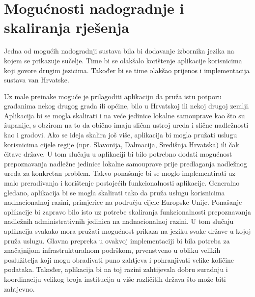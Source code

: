 		\eject
		
		\section{Mogućnosti nadogradnje i skaliranja rješenja} 
		
		Jedna od mogućih nadogradnji sustava bila bi dodavanje izbornika jezika na kojem se prikazuje sučelje. Time bi se olakšalo korištenje aplikacije korisnicima koji govore drugim jezicima. Također bi se time olakšao prijenos i implementacija sustava van Hrvatske.
		
		Uz male preinake moguće je prilagoditi aplikaciju da pruža istu potporu građanima nekog drugog grada ili općine, bilo u Hrvatskoj ili nekoj drugoj zemlji. Aplikacija bi se mogla skalirati i na veće jedinice lokalne samouprave kao što su županije, s obzirom na to da obično imaju sličan ustroj ureda i slične nadležnosti kao i gradovi. Ako se ideja skalira još više, aplikacija bi mogla pružati uslugu korisnicima cijele regije (npr. Slavonija, Dalmacija, Središnja Hrvatska) ili čak čitave države. U tom slučaju u aplikaciji bi bilo potrebno dodati mogućnost prepoznavanja nadležne jedinice lokalne samouprave prije predlaganja nadležnog ureda za konkretan problem. Takvo ponašanje bi se moglo implementirati uz malo prerađivanja i korištenje postojećih funkcionalnosti aplikacije. Generalno gledano, aplikacija bi se mogla skalirati tako da pruža uslugu korisnicima nadnacionalnoj razini, primjerice na području cijele Europske Unije. Ponašanje aplikacije bi zapravo bilo isto uz potrebe skaliranja funkcionalnosti prepoznavanja nadležnih administrativnih jedinica na nadnacionalnoj razini. U tom slučaju aplikacija svakako mora pružati mogućnost prikaza na jeziku svake države u kojoj pruža uslugu. Glavna prepreka u ovakvoj implementaciji bi bila potreba za značajnijom infrastrukturalnom podrškom, prvenstveno u obliku velikih poslužitelja koji mogu obrađivati puno zahtjeva i pohranjivati velike količine podataka. Također, aplikacija bi na toj razini zahtijevala dobru suradnju i koordinaciju velikog broja institucija u više različitih država što može biti zahtjevno.
		
		\eject
		